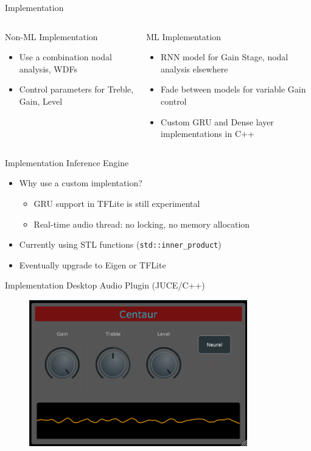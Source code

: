 \begin{frame}{Implementation}
    \begin{columns}
        \begin{column}{0.45\linewidth}
            Non-ML Implementation
            \begin{itemize}
                \item Use a combination nodal analysis, WDFs
                \item Control parameters for Treble, Gain, Level
            \end{itemize}
        \end{column}
        \begin{column}{0.55\linewidth}
            ML Implementation
            \begin{itemize}
                \item RNN model for Gain Stage, nodal analysis elsewhere
                \item Fade between models for variable Gain control
                \item Custom GRU and Dense layer implementations in C++
            \end{itemize}
        \end{column}
    \end{columns}
\end{frame}

\begin{frame}{Implementation}
    Inference Engine
    \begin{itemize}
        \item Why use a custom implentation?
        \begin{itemize}
            \item GRU support in TFLite is still experimental
            \item Real-time audio thread: no locking, no memory allocation
        \end{itemize}
        \item Currently using STL functions (\texttt{std::inner\_product})
        \item Eventually upgrade to Eigen or TFLite
    \end{itemize}
\end{frame}

\begin{frame}{Implementation}
    Desktop Audio Plugin (JUCE/C++)
    \begin{figure}
        \centering
        \includegraphics[height=2.5in]{../Paper/Figures/Plugin.png}
    \end{figure}
\end{frame}

